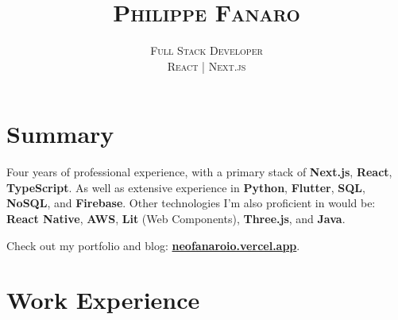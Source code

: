\documentclass[14pt]{extarticle}
\title{\scshape \huge \vspace{-1.5cm} Philippe Fanaro}
\author{%
  \scshape \Large Full Stack Developer\\[0.5cm]%
  \scshape \Large React | Next.js%
  \vspace{0.6cm}%
}
\date{}
\renewcommand{\_}{\leavevmode\kern.06em\vbox{\hrule width.425em}}
\newenvironment{cssquote}{%
  \begin{mdframed}[style=CSSquote]
}{%
  \end{mdframed}
}
\begin{document}
\maketitle

\section{Summary}

Four years of professional experience, with a primary stack of \textbf{Next.js}, \textbf{React}, \textbf{TypeScript}. As well as extensive experience in \textbf{Python}, \textbf{Flutter}, \textbf{SQL}, \textbf{NoSQL}, and \textbf{Firebase}. Other technologies I'm also proficient in would be: \textbf{React Native}, \textbf{AWS}, \textbf{Lit} (Web Components), \textbf{Three.js}, and \textbf{Java}.

\vspace{0.4cm}

\begin{cssquote}
Check out my portfolio and blog: \textbf{\href{https://neofanaroio.vercel.app}{neofanaroio.vercel.app}}.
\end{cssquote}

\section{Work Experience}
\end{document}
